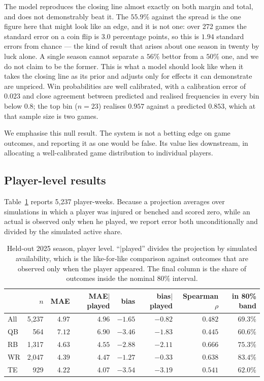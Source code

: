 \documentclass[11pt,a4paper]{article}
\begin{document}
The model reproduces the closing line almost exactly on both margin and total,
and does not demonstrably beat it. The $55.9\%$ against the spread is the one
figure here that might look like an edge, and it is not one: over 272 games the
standard error on a coin flip is $3.0$ percentage points, so this is $1.94$
standard errors from chance --- the kind of result that arises about one season
in twenty by luck alone. A single season cannot separate a $56\%$ bettor from a
$50\%$ one, and we do not claim to be the former. This is what a model should
look like when it takes the closing line as its prior and adjusts only for
effects it can demonstrate are unpriced. Win probabilities are well calibrated, with a calibration error of
$0.023$ and close agreement between predicted and realised frequencies in every
bin below $0.8$; the top bin ($n = 23$) realises $0.957$ against a predicted
$0.853$, which at that sample size is two games.

We emphasise this null result. The system is not a betting edge on game
outcomes, and reporting it as one would be false. Its value lies downstream, in
allocating a well-calibrated game distribution to individual players.

\subsection{Player-level results}

Table~\ref{tab:player} reports 5{,}237 player-weeks. Because a projection
averages over simulations in which a player was injured or benched and scored
zero, while an actual is observed only when he played, we report error both
unconditionally and divided by the simulated active share.

\begin{table}[t]
\centering
\caption{Held-out 2025 season, player level. ``$\mid$played'' divides the
projection by simulated availability, which is the like-for-like comparison
against outcomes that are observed only when the player appeared. The final
column is the share of outcomes inside the nominal $80\%$ interval.}
\label{tab:player}
\begin{tabular}{lrrrrrrr}
\toprule
& $n$ & MAE & MAE$\mid$played & bias & bias$\mid$played & Spearman $\rho$ & in 80\% band \\
\midrule
All & 5{,}237 & $4.97$ & $4.96$ & $-1.65$ & $-0.82$ & $0.482$ & $69.3\%$ \\
QB  & 564     & $7.12$ & $6.90$ & $-3.46$ & $-1.83$ & $0.445$ & $60.6\%$ \\
RB  & 1{,}317 & $4.63$ & $4.55$ & $-2.88$ & $-2.11$ & $0.666$ & $75.3\%$ \\
WR  & 2{,}047 & $4.39$ & $4.47$ & $-1.27$ & $-0.33$ & $0.638$ & $83.4\%$ \\
TE  & 929     & $4.22$ & $4.07$ & $-3.54$ & $-3.19$ & $0.541$ & $62.0\%$ \\
\bottomrule
\end{tabular}
\end{table}
\end{document}
